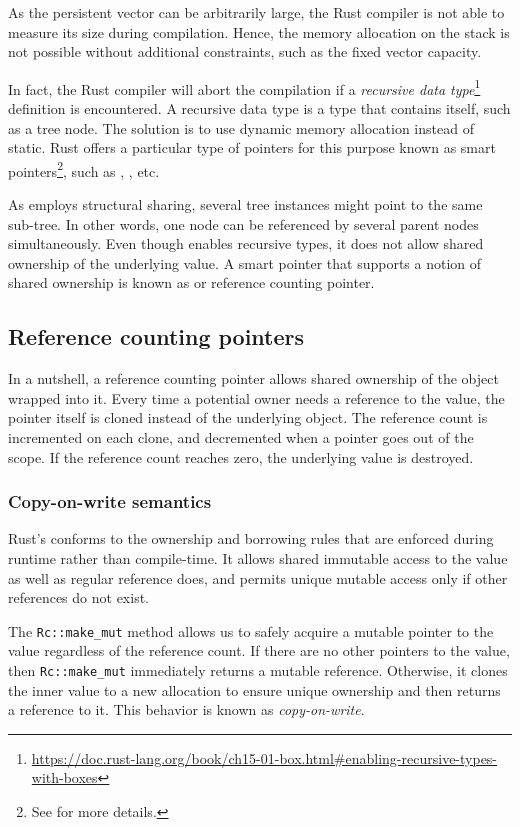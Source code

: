 As the persistent vector can be arbitrarily large, the Rust compiler is not able to measure its size during compilation. Hence, the memory allocation on the stack is not possible without additional constraints, such as the fixed vector capacity.

In fact, the Rust compiler will abort the compilation if a \emph{recursive data type}\footnote{\url{https://doc.rust-lang.org/book/ch15-01-box.html\#enabling-recursive-types-with-boxes}} definition is encountered. A recursive data type is a type that contains itself, such as a tree node. The solution is to use dynamic memory allocation instead of static. Rust offers a particular type of pointers for this purpose known as smart pointers\footnote{See  for more details.}, such as \boxptr{}, \rc{}, etc.

As \rrbtree{} employs structural sharing, several tree instances might point to the same sub-tree. In other words, one node can be referenced by several parent nodes simultaneously. Even though \boxptr{} enables recursive types, it does not allow shared ownership of the underlying value. A smart pointer that supports a notion of shared ownership is known as \rc{} or reference counting pointer.

\subsection{Reference counting pointers}
In a nutshell, a reference counting pointer allows shared ownership of the object wrapped into it. Every time a potential owner needs a reference to the value, the pointer itself is cloned instead of the underlying object. The reference count is incremented on each clone, and decremented when a pointer goes out of the scope. If the reference count reaches zero, the underlying value is destroyed.

\subsubsection*{Copy-on-write semantics}
Rust’s \rc{} conforms to the ownership and borrowing rules that are enforced during runtime rather than compile-time. It allows shared immutable access to the value as well as regular reference does, and permits unique mutable access only if other references do not exist.

The \texttt{Rc::make_mut} method allows us to safely acquire a mutable pointer to the value regardless of the reference count. If there are no other pointers to the value, then \texttt{Rc::make_mut} immediately returns a mutable reference. Otherwise, it clones the inner value to a new allocation to ensure unique ownership and then returns a reference to it. This behavior is known as \emph{copy-on-write}.

